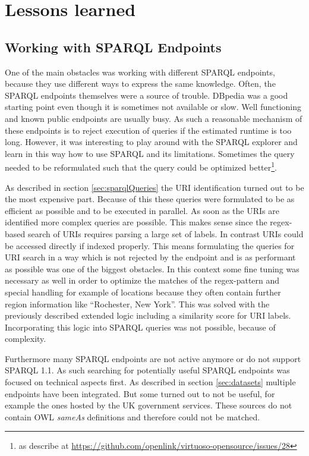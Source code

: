 \newpage
\section{Lessons learned}
\subsection{Working with SPARQL Endpoints}
One of the main obstacles was working with different SPARQL endpoints, because they use different ways to express the same knowledge. Often, the SPARQL endpoints themselves were a source of trouble. DBpedia was a good starting point even though it is sometimes not available or slow. Well functioning and known public endpoints are usually busy. As such a reasonable mechanism of these endpoints is to reject execution of queries if the estimated runtime is too long. However, it was interesting to play around with the SPARQL explorer and learn in this way how to use SPARQL and its limitations. Sometimes the query needed to be reformulated such that the query could be optimized better\footnote{as describe at \url{https://github.com/openlink/virtuoso-opensource/issues/28}}.

As described in section \ref{sec:sparqlQueries} the URI identification turned out to be the most expensive part. Because of this  these queries were formulated to be as efficient as possible and to be executed in parallel. As soon as the URIs are identified more complex queries are possible. This makes sense since the regex-based search of URIs requires parsing a large set of labels. In contrast URIs could be accessed directly if indexed properly. This means formulating the queries for URI search in a way which is not rejected by the endpoint and is as performant as possible was one of the biggest obstacles. In this context some fine tuning was necessary as well in order to optimize the matches of the regex-pattern and special handling for example of locations because they often contain further region information like ``Rochester, New York''. This was solved with the previously described extended logic including a similarity score for URI labels. Incorporating this logic into SPARQL queries was not possible, because of complexity. 

Furthermore many SPARQL endpoints are not active anymore or do not support SPARQL 1.1. As such searching for potentially useful SPARQL endpoints was focused on technical aspects first. As described in section \ref{sec:datasets} multiple endpoints have been integrated. But some turned out to not be useful, for example the ones hosted by the UK government services. These sources do not contain OWL \textit{sameAs} definitions and therefore could not be matched.


